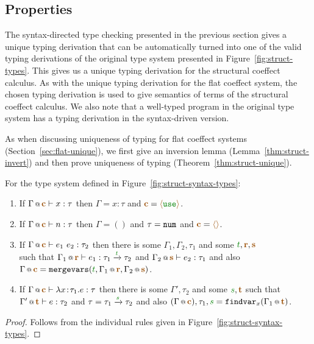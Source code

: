 
\subsection{Properties}

The syntax-directed type checking presented in the previous section gives a unique typing derivation
that can be automatically turned into one of the valid typing derivations of the original type system
presented in Figure~\ref{fig:struct-types}. This gives us a unique typing derivation for the
structural coeffect calculus. As with the unique typing derivation for the flat coeffect system,
the chosen typing derivation is used to give semantics of terms of the structural coeffect calculus.
We also note that a well-typed program in the original type system has a typing derivation in the
syntax-driven version.

As when discussing uniqueness of typing for flat coeffect systems (Section~\ref{sec:flat-unique}),
we first give an inversion lemma (Lemma~\ref{thm:struct-invert}) and then prove
uniqueness of typing (Theorem~\ref{thm:struct-unique}).

\begin{lemma}
\label{thm:struct-invert}
For the type system defined in Figure~\ref{fig:struct-syntax-types}:
%
\begin{enumerate}
\raggedright
\item If $\coctx{\Gamma}{\aclrd{\textbf{c}}} \vdash x : \tau$ then $\Gamma = x\!:\!\tau$ and $\aclrd{\textbf{c}} = \alift{\cunit}$.
\item If $\coctx{\Gamma}{\aclrd{\textbf{c}}} \vdash n : \tau$ then $\Gamma = ()$ and $\tau = \ident{num}$ and $\aclrd{\textbf{c}} = \alift{}$.
\item If $\coctx{\Gamma}{\aclrd{\textbf{c}}} \vdash e_1~e_2 : \tau_2$
  then there is some $\Gamma_1, \Gamma_2, \tau_1$ and some $\cclrd{t}, \aclrd{\textbf{r}}, \aclrd{\textbf{s}}$ \\ such that
  $\coctx{\Gamma_1}{\aclrd{\textbf{r}}} \vdash e_1 : \tau_1 \xrightarrow{\cclrd{t}} \tau_2$ and
  $\coctx{\Gamma_2}{\aclrd{\textbf{s}}} \vdash e_2 : \tau_1$ and also
  $\coctx{\Gamma}{\aclrd{\textbf{c}}} = \ident{mergevars}(\cclrd{t}, \coctx{\Gamma_1}{\aclrd{\textbf{r}}}, \coctx{\Gamma_2}{\aclrd{\textbf{s}}})$.
\item If $\coctx{\Gamma}{\aclrd{\textbf{c}}} \vdash \lambda x\!:\!\tau_1.e : \tau$
  then there is some $\Gamma', \tau_2$ and some $\cclrd{s}, \aclrd{\textbf{t}}$ such that
  $\coctx{\Gamma'}{\aclrd{\textbf{t}}} \vdash e : \tau_2$ and
  $\tau = \tau_1 \xrightarrow{\cclrd{s}} \tau_2$ and also
  $(\coctx{\Gamma}{\aclrd{\textbf{c}}}), \tau_1, \cclrd{s} = \ident{findvar}_x(\coctx{\Gamma_1}{\aclrd{\textbf{t}}})$.
\end{enumerate}
\end{lemma}
\begin{proof}
Follows from the individual rules given in Figure~\ref{fig:struct-syntax-types}.
\end{proof}

